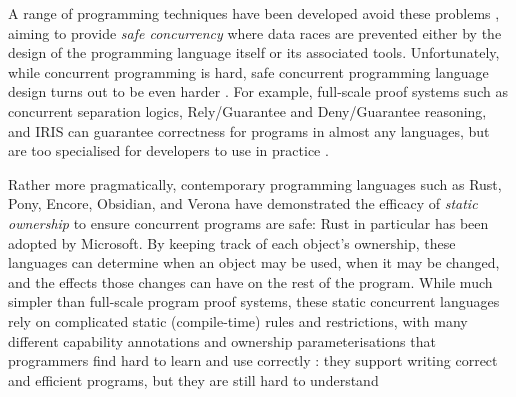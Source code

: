 A range of programming techniques have been developed avoid these problems
\cite{lea98,concurrentHard}, aiming to provide \textit{safe
  concurrency} where data races are prevented either by the design  of the
programming language itself or its associated tools.  Unfortunately, while 
concurrent programming is hard, safe concurrent programming language
design turns out to be even harder \cite{RustBook,EncoreTS}. 
%
For example, full-scale proof systems
such as concurrent separation logics\cite{JacobsEA05,chalice},
Rely/Guarantee\cite{jonesTOPLAS83,MPC-Staden15,concur2007} and
Deny/Guarantee\cite{DenyGuarantee} reasoning, and IRIS\cite{dd}
can guarantee correctness for programs in almost any languages,
but are too specialised for developers to use in practice
\cite{fonesca2017,shriramFormal2019}.

Rather more pragmatically,
contemporary programming languages such as
Rust\cite{RustBook}, Pony\cite{PonyTS},
Encore\cite{EncoreTS},
Obsidian\cite{aldrichObsidianStudy2020}, and
Verona \cite{Verona} 
have demonstrated the efficacy of \textit{static
  ownership}\cite{ClaPotNobOOPSLA98,NobPotVitECOOP98} %
to ensure
concurrent programs are safe: Rust in particular has been adopted by
Microsoft\cite{RustPopular,MSRust}. By keeping track of each object's
ownership, these languages can determine when an object may be used,
when it may be changed, and the effects those changes can have on the
rest of the program.
%
%
%
%
While much simpler than full-scale program proof systems, these static
concurrent 
languages rely on complicated static (compile-time) rules and
restrictions, with many different capability annotations and ownership
parameterisations that programmers find hard to learn and use
correctly \cite{LearnRust,VizRust,HardRust}: they support writing
correct and efficient programs, but they are still hard to understand
